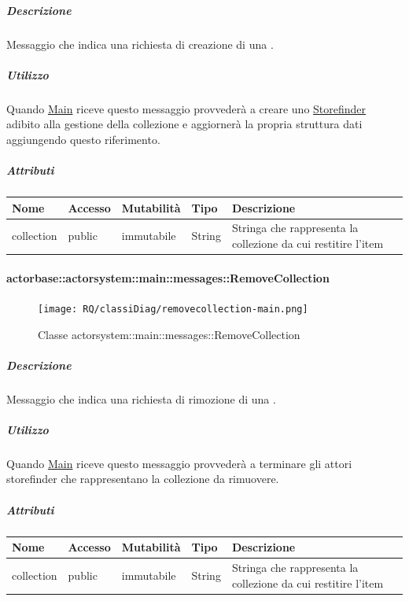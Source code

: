 \documentclass{scalatekids-article}
\begin{document}
\subparagraph{Descrizione}
Messaggio che indica una richiesta di creazione di una .

\subparagraph{Utilizzo}
Quando \hyperref[sec:actorbase::actorsystem::main::Main]{Main}
riceve questo messaggio provvederà a creare uno \hyperref[sec:actorbase::actorsystem::storefinder::Storefinder]{Storefinder} adibito
alla gestione della collezione e aggiornerà la propria struttura dati
aggiungendo questo riferimento.

\subparagraph{Attributi}
\begin{tabular}{| p{3cm} | p{1.5cm} | p{2cm} | p{2cm} | p{8.5cm} |}
  \hline
  Nome & Accesso & Mutabilità & Tipo & Descrizione\\
  \hline
  collection & public & immutabile & String & Stringa che rappresenta la collezione da cui restitire l'item\\
  \hline
\end{tabular}

\paragraph{actorbase::actorsystem::main::messages::RemoveCollection}
\label{sec:actorbase::actorsystem::main::messages::RemoveCollection}

\begin{figure}[H]
   \begin{center}
     \texttt{[image: RQ/classiDiag/removecollection-main.png]}
     \caption{Classe actorsystem::main::messages::RemoveCollection}
   \end{center}
 \end{figure}

\subparagraph{Descrizione}
Messaggio che indica una richiesta di rimozione di una .

\subparagraph{Utilizzo}
Quando \hyperref[sec:actorbase::actorsystem::main::Main]{Main}
riceve questo messaggio provvederà a terminare gli attori storefinder
che rappresentano la collezione da rimuovere.

\subparagraph{Attributi}
\begin{tabular}{| p{3cm} | p{1.5cm} | p{2cm} | p{2cm} | p{8.5cm} |}
  \hline
  Nome & Accesso & Mutabilità & Tipo & Descrizione\\
  \hline
  collection & public & immutabile & String & Stringa che rappresenta la collezione da cui restitire l'item\\
  \hline
\end{tabular}
\end{document}
